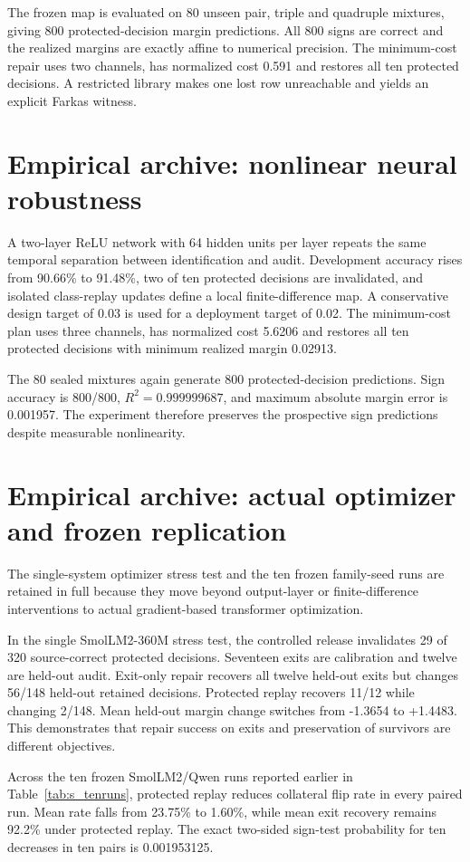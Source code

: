 \documentclass[11pt,letterpaper]{article}
\theoremstyle{plain}
\newcommand{\1}{\mathbf 1}
\begin{document}
The frozen map is evaluated on 80 unseen pair, triple and quadruple mixtures, giving 800 protected-decision margin predictions. All 800 signs are correct and the realized margins are exactly affine to numerical precision. The minimum-cost repair uses two channels, has normalized cost 0.591 and restores all ten protected decisions. A restricted library makes one lost row unreachable and yields an explicit Farkas witness.

\section{Empirical archive: nonlinear neural robustness}
A two-layer ReLU network with 64 hidden units per layer repeats the same temporal separation between identification and audit. Development accuracy rises from 90.66\% to 91.48\%, two of ten protected decisions are invalidated, and isolated class-replay updates define a local finite-difference map. A conservative design target of 0.03 is used for a deployment target of 0.02. The minimum-cost plan uses three channels, has normalized cost 5.6206 and restores all ten protected decisions with minimum realized margin 0.02913.

The 80 sealed mixtures again generate 800 protected-decision predictions. Sign accuracy is 800/800, $R^2=0.999999687$, and maximum absolute margin error is 0.001957. The experiment therefore preserves the prospective sign predictions despite measurable nonlinearity.

\section{Empirical archive: actual optimizer and frozen replication}
The single-system optimizer stress test and the ten frozen family-seed runs are retained in full because they move beyond output-layer or finite-difference interventions to actual gradient-based transformer optimization.

In the single SmolLM2-360M stress test, the controlled release invalidates 29 of 320 source-correct protected decisions. Seventeen exits are calibration and twelve are held-out audit. Exit-only repair recovers all twelve held-out exits but changes 56/148 held-out retained decisions. Protected replay recovers 11/12 while changing 2/148. Mean held-out margin change switches from -1.3654 to +1.4483. This demonstrates that repair success on exits and preservation of survivors are different objectives.

Across the ten frozen SmolLM2/Qwen runs reported earlier in Table~\ref{tab:s_tenruns}, protected replay reduces collateral flip rate in every paired run. Mean rate falls from 23.75\% to 1.60\%, while mean exit recovery remains 92.2\% under protected replay. The exact two-sided sign-test probability for ten decreases in ten pairs is 0.001953125.
\end{document}
